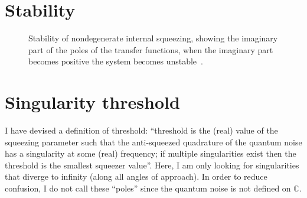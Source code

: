 

\section{Stability}


\begin{figure}
	\centering
	\caption{Stability of nondegenerate internal squeezing, showing the imaginary part of the poles of the transfer functions, when the imaginary part becomes positive the system becomes unstable~\cite{}.}
	\label{fig:}
\end{figure}

\section{Singularity threshold}
\label{sec:singularity_threshold}






I have devised a definition of threshold: ``threshold is the (real) value of the squeezing parameter such that the anti-squeezed quadrature of the quantum noise has a singularity at some (real) frequency; if multiple singularities exist then the threshold is the smallest squeezer value''. Here, I am only looking for singularities that diverge to infinity (along all angles of approach). In order to reduce confusion, I do not call these ``poles'' since the quantum noise is not defined on $\mathbb{C}$. 

